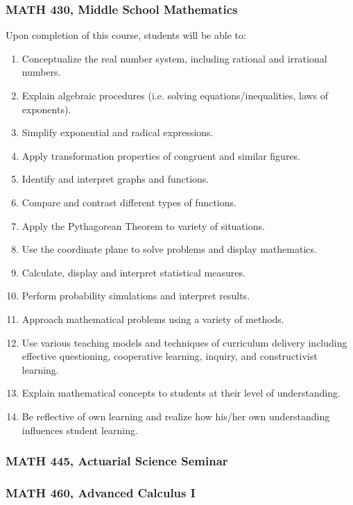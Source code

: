 \documentclass[11pt]{article}
\newenvironment{alphalist}{
\begin{enumerate}[label=(\arabic*),widest=107 ,leftmargin=25pt, itemsep=0pt]}
{\end{enumerate}}
\begin{document}
\subsubsection*{MATH 430,  Middle School Mathematics}

Upon completion of this course, students will be able to: 
\begin{alphalist}
\item Conceptualize the real number system, including rational and irrational numbers. 
\item Explain algebraic procedures (i.e. solving equations/inequalities, laws of exponents). 
\item Simplify exponential and radical expressions. 
\item Apply transformation properties of congruent and similar figures. 
\item Identify and interpret graphs and functions. 
\item Compare and contrast different types of functions. 
\item Apply the Pythagorean Theorem to variety of situations. 
\item Use the coordinate plane to solve problems and display mathematics. 
\item Calculate, display and interpret statistical measures. 
\item Perform probability simulations and interpret results. 
\item Approach mathematical problems using a variety of methods. 
\item Use various teaching models and techniques of curriculum delivery including effective questioning, cooperative learning, inquiry, and constructivist learning. 
\item Explain mathematical concepts to students at their level of understanding. 
\item Be reflective of own learning and realize how his/her own understanding influences student learning.
\end{alphalist}

\subsubsection*{MATH 445, Actuarial Science Seminar}


\subsubsection*{MATH 460, Advanced Calculus I}
\end{document}
